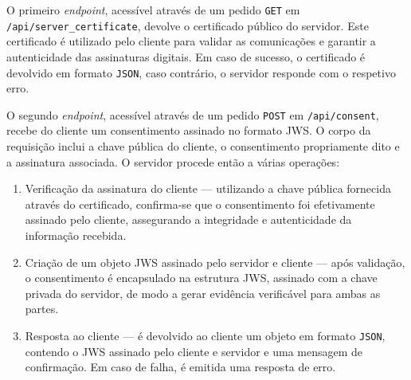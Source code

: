 O primeiro \textit{endpoint}, acessível através de um pedido \texttt{GET} em \texttt{/api/server\_certificate}, devolve o certificado público do servidor. Este certificado é utilizado pelo cliente para validar as comunicações e garantir a autenticidade das assinaturas digitais. Em caso de sucesso, o certificado é devolvido em formato \texttt{JSON}, caso contrário, o servidor responde com o respetivo erro.

O segundo \textit{endpoint}, acessível através de um pedido \texttt{POST} em \texttt{/api/consent}, recebe do cliente um consentimento assinado no formato JWS. O corpo da requisição inclui a chave pública do cliente, o consentimento propriamente dito e a assinatura associada. O servidor procede então a várias operações:

\begin{enumerate}
    \item Verificação da assinatura do cliente — utilizando a chave pública fornecida através do certificado, confirma-se que o consentimento foi efetivamente assinado pelo cliente, assegurando a integridade e autenticidade da informação recebida.
    \item Criação de um objeto JWS assinado pelo servidor e cliente — após validação, o consentimento é encapsulado na estrutura JWS, assinado com a chave privada do servidor, de modo a gerar evidência verificável para ambas as partes.
    \item Resposta ao cliente — é devolvido ao cliente um objeto em formato \texttt{JSON}, contendo o JWS assinado pelo cliente e servidor e uma mensagem de confirmação. Em caso de falha, é emitida uma resposta de erro.
\end{enumerate}

%
%
%
%
%
%
%
%

